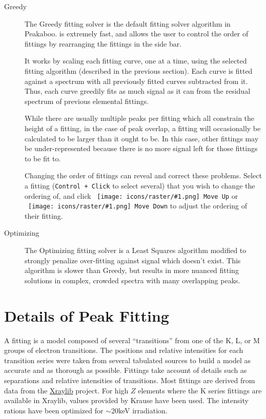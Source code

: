 \documentclass[article,twoside,11pt]{report}
\newcommand{\command}[1]{\texttt{#1}}
\newcommand{\icon}[1]{\texttt{[image: icons/raster/\#1.png]}}
\newcommand{\button}[2]{\ \command{\icon{#1} #2}}
\newcommand{\shortcut}[2]{\command{#1 + #2}}
\newcommand{\tocsection}[1]{\section*{#1}\addcontentsline{toc}{section}{#1}}
\begin{document}
\begin{description}

\item [Greedy] The Greedy fitting solver is the default fitting solver algorithm in Peakaboo. is extremely fast, and allows the user to control the order of fittings by rearranging the fittings in the side bar. 

It works by scaling each fitting curve, one at a time, using the selected fitting algorithm (described in the previous section). Each curve is fitted against a spectrum with all previously fitted curves subtracted from it. Thus, each curve greedily fits as much signal as it can from the residual spectrum of previous elemental fittings.

While there are usually multiple peaks per fitting which all constrain the height of a fitting, in the case of peak overlap, a fitting will occasionally be calculated to be larger than it ought to be. In this case, other fittings may be under-represented because there is no more signal left for those fittings to be fit to.

Changing the order of fittings can reveal and correct these problems. Select a fitting (\shortcut{Control}{Click} to select several) that you wish to change the ordering of, and click \button{go-up}{Move Up} or \button{go-down}{Move Down} to adjust the ordering of their fitting.


\item [Optimizing] The Optimizing fitting solver is a Least Squares algorithm modified to strongly penalize over-fitting against signal which doesn't exist. This algorithm is slower than Greedy, but results in more nuanced fitting solutions in complex, crowded spectra with many overlapping peaks.

\end{description}


\tocsection{Details of Peak Fitting}

A fitting is a model composed of several ``transitions'' from one of the K, L, or M groups of electron transitions. The positions and relative intensities for each transition series were taken from several tabulated sources to build a model as accurate and as thorough as possible. Fittings take account of details such as separations and relative intensities of transitions. Most fittings are derived from data from the \href{https://github.com/tschoonj/xraylib}{Xraylib} project. For high $Z$ elements where the K series fittings are available in Xraylib, values provided by Krause 
\cite{kraus} have been used. The intensity rations have been optimized for $\sim$20keV irradiation.
\end{document}
